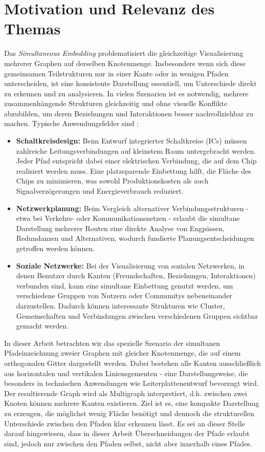 \documentclass[bachelor, german]{algothesis}
\begin{document}
\section{Motivation und Relevanz des Themas}
Das \emph{Simultaneous Embedding} problematisiert die gleichzeitige Visualisierung mehrerer Graphen auf derselben Knotenmenge. Insbesondere wenn sich diese gemeinsamen Teilstrukturen nur in einer Kante oder in wenigen Pfaden unterscheiden, ist eine konsistente Darstellung essentiell, um Unterschiede direkt zu erkennen und zu analysieren. In vielen Szenarien ist es notwendig, mehrere zusammenhängende Strukturen gleichzeitig und ohne visuelle Konflikte abzubilden, um deren Beziehungen und Interaktionen besser nachvollziehbar zu machen. Typische Anwendungsfelder sind \cite{Handbook}:
\begin{itemize}
  \item \textbf{Schaltkreisdesign:} Beim Entwurf integrierter Schaltkreise (ICs) müssen zahlreiche Leitungsverbindungen auf kleinstem Raum untergebracht werden. Jeder Pfad entspricht dabei einer elektrischen Verbindung, die auf dem Chip realisiert werden muss. Eine platzsparende Einbettung hilft, die Fläche des Chips zu minimieren, was sowohl Produktionskosten als auch Signalverzögerungen und Energieverbrauch reduziert.
  \item \textbf{Netzwerkplanung:} Beim Vergleich alternativer Verbindungsstrukturen - etwa bei Verkehrs- oder Kommunikationsnetzen - erlaubt die simultane Darstellung mehrerer Routen eine direkte Analyse von Engpässen, Redundanzen und Alternativen, wodurch fundierte Planungsentscheidungen getroffen werden können.
  \item \textbf{Soziale Netzwerke:} Bei der Visualisierung von sozialen Netzwerken, in denen Benutzer durch Kanten (Freundschaften, Beziehungen, Interaktionen) verbunden sind, kann eine simultane Einbettung genutzt werden, um verschiedene Gruppen von Nutzern oder Communitys nebeneinander darzustellen. Dadurch können interessante Strukturen wie Cluster, Gemeinschaften und Verbindungen zwischen verschiedenen Gruppen sichtbar gemacht werden.
\end{itemize}
In dieser Arbeit betrachten wir das spezielle Szenario der simultanen Pfadeinzeichnung zweier Graphen mit gleicher Knotenmenge, die auf einem orthogonalen Gitter dargestellt werden. Dabei bestehen alle Kanten ausschließlich aus horizontalen und vertikalen Liniensgementen - eine Darstellungsweise, die besonders in technischen Anwendungen wie Leiterplattenentwurf bevorzugt wird. Der resultierende Graph wird als Multigraph interpretiert, d.h. zwischen zwei Knoten können mehrere Kanten existieren. Ziel ist es, eine kompakte Darstellung zu erzeugen, die möglichst wenig Fläche benötigt und dennoch die strukturellen Unterschiede zwischen den Pfaden klar erkennen lässt. Es sei an dieser Stelle darauf hingewiesen, dass in dieser Arbeit Überschneidungen der Pfade erlaubt sind, jedoch nur zwischen den Pfaden selbst, nicht aber innerhalb eines Pfades.
\end{document}
